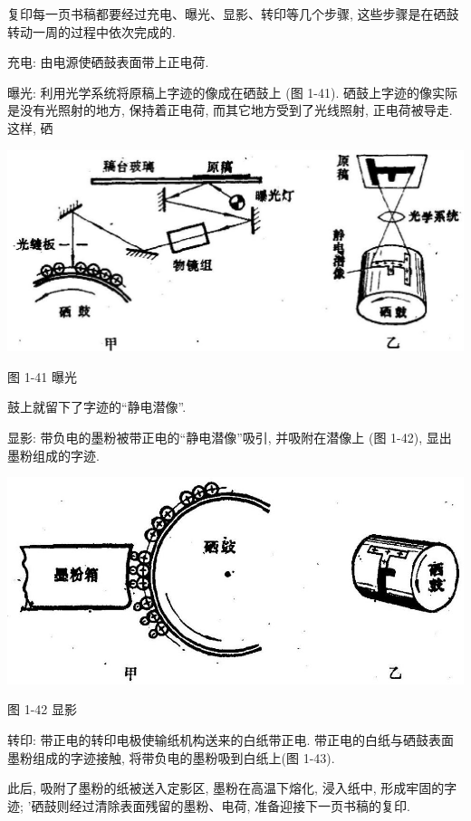 \documentclass[10pt]{article}
\begin{document}
复印每一页书稿都要经过充电、曝光、显影、转印等几个步骤, 这些步骤是在硒鼓转动一周的过程中依次完成的.

充电: 由电源使硒鼓表面带上正电荷.

曝光: 利用光学系统将原稿上字迹的像成在硒鼓上 (图 1-41). 硒鼓上字迹的像实际是没有光照射的地方, 保持着正电荷, 而其它地方受到了光线照射, 正电荷被导走. 这样, 硒

\begin{center}
\includegraphics[max width=1.0\textwidth]{images/01913056-1f15-74d8-9184-9aab52c9d66b_53_340113.jpg}
\end{center}

图 1-41 曝光

鼓上就留下了字迹的“静电潜像”.

显影: 带负电的墨粉被带正电的“静电潜像”吸引, 并吸附在潜像上 (图 1-42), 显出墨粉组成的字迹.

\begin{center}
\includegraphics[max width=1.0\textwidth]{images/01913056-1f15-74d8-9184-9aab52c9d66b_53_472283.jpg}
\end{center}

图 1-42 显影

转印: 带正电的转印电极使输纸机构送来的白纸带正电. 带正电的白纸与硒鼓表面墨粉组成的字迹接触, 将带负电的墨粉吸到白纸上(图 1-43).

此后, 吸附了墨粉的纸被送入定影区, 墨粉在高温下熔化, 浸入纸中, 形成牢固的字迹; ’硒鼓则经过清除表面残留的墨粉、电荷, 准备迎接下一页书稿的复印.
\end{document}

